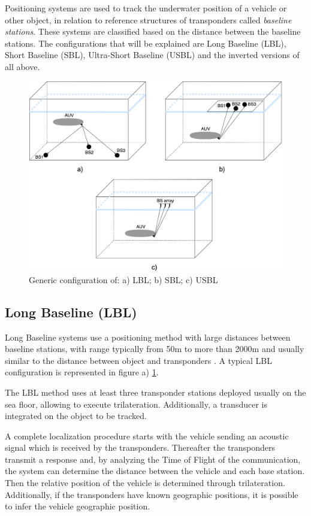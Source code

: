 Positioning systems are used to track the underwater position of a vehicle or other object, in relation to reference structures of transponders called \textit{baseline stations}. These systems are classified based on the distance between the baseline stations. The configurations that will be explained are Long Baseline (LBL), Short Baseline (SBL), Ultra-Short Baseline (USBL) and the inverted versions of all above.

\begin{figure}[!htbp]
	\centering
	\includegraphics[width=1\textwidth]{figures/lblsblusbl}
	\caption{Generic configuration of: a) LBL; b) SBL; c) USBL}
	\label{fig:lblsblusbl}
\end{figure}

\subsection{Long Baseline (LBL)}

Long Baseline systems use a positioning method with large distances between baseline stations, with range typically from 50m to more than 2000m  and usually similar to the distance between object and transponders \cite{crosscorr}. A typical LBL configuration is represented in figure a) \ref{fig:lblsblusbl}.

The LBL method uses at least three transponder stations deployed usually on the sea floor, allowing to execute trilateration. Additionally, a transducer is integrated on the object to be tracked. 

A complete localization procedure starts with the vehicle sending an acoustic signal which is received by the transponders. Thereafter the transponders transmit a response and, by analyzing the Time of Flight of the communication, the system can determine the distance between the vehicle and each base station. Then the relative position of the vehicle is determined through trilateration. Additionally, if the transponders have known geographic positions, it is possible to infer the vehicle geographic position. 

